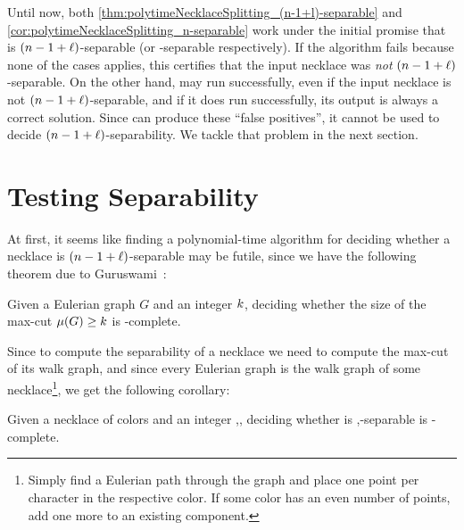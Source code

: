 \documentclass[a4paper,UKenglish,cleveref, thm-restate]{lipics-v2021}
\begin{document}
Until now, both \cref{thm:polytimeNecklaceSplitting_(n-1+l)-separable} and \cref{cor:polytimeNecklaceSplitting_n-separable} work under the initial promise that \Colors is $(\dimension-1+\constB)$-separable (or \dimension-separable respectively). If the algorithm fails because none of the cases applies, this certifies that the input necklace was \emph{not} $(\dimension-1+\constB)$-separable. On the other hand,  may run successfully, even if the input necklace is not $(\dimension-1+\constB)$-separable, and if it does run successfully, its output is always a correct solution. Since  can produce these ``false positives'', it cannot be used to decide $(\dimension-1+\constB)$-separability. We tackle that problem in the next section.


\section{Testing Separability}

At first, it seems like finding a polynomial-time algorithm for deciding whether a necklace is $(\dimension-1+\constB)$-separable may be futile, since we have the following theorem due to Guruswami~\cite{maxCutEulerian}:

\begin{theorem}
Given a Eulerian graph $G$ and an integer $\sep$, deciding whether the size of the max-cut $\mu(G)\geq \sep$ is \NP-complete.
\end{theorem}
Since to compute the separability of a necklace we need to compute the max-cut of its walk graph, and since every Eulerian graph is the walk graph of some necklace\footnote{Simply find a Eulerian path through the graph and place one point per character in the respective color. If some color has an even number of points, add one more to an existing component.}, we get the following corollary:
\begin{corollary}
\label{cor:k-SeparabilityIsNPComplete}
    Given a necklace \Colors of \dimension colors and an integer \sep, deciding whether \Colors is \sep-separable is \coNP-complete.
\end{corollary}
\end{document}
